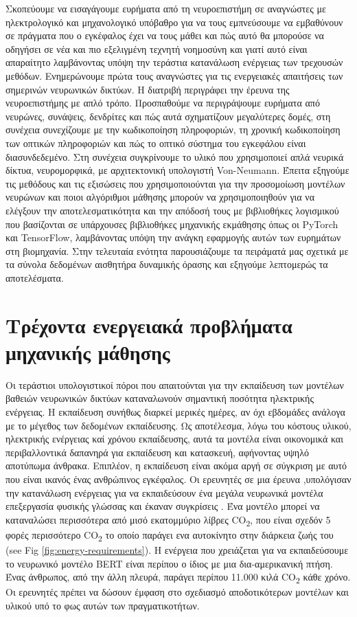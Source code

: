 \documentclass[12pt]{report}
\begin{document}
Σκοπεύουμε να εισαγάγουμε ευρήματα από τη νευροεπιστήμη σε αναγνώστες με ηλεκτρολογικό και μηχανολογικό υπόβαθρο για να τους εμπνεύσουμε να εμβαθύνουν σε πράγματα που ο εγκέφαλος έχει να τους μάθει και πώς αυτό θα μπορούσε να οδηγήσει σε νέα και πιο εξελιγμένη τεχνητή νοημοσύνη και γιατί αυτό είναι απαραίτητο λαμβάνοντας υπόψη την τεράστια κατανάλωση ενέργειας των τρεχουσών μεθόδων. Ενημερώνουμε πρώτα τους αναγνώστες για τις ενεργειακές απαιτήσεις των σημερινών νευρωνικών δικτύων. Η διατριβή περιγράφει την έρευνα της νευροεπιστήμης με απλό τρόπο. Προσπαθούμε να περιγράψουμε ευρήματα από νευρώνες, συνάψεις, δενδρίτες και πώς αυτά σχηματίζουν μεγαλύτερες δομές, στη συνέχεια συνεχίζουμε με την κωδικοποίηση πληροφοριών, τη χρονική κωδικοποίηση των οπτικών πληροφοριών και πώς το οπτικό σύστημα του εγκεφάλου είναι διασυνδεδεμένο. Στη συνέχεια συγκρίνουμε το υλικό που χρησιμοποιεί απλά νευρικά δίκτυα, νευρομορφικά, με αρχιτεκτονική υπολογιστή  \textlatin{Von-Neumann}. Έπειτα εξηγούμε τις μεθόδους και τις εξισώσεις που χρησιμοποιούνται για την προσομοίωση μοντέλων νευρώνων και ποιοι αλγόριθμοι μάθησης μπορούν να χρησιμοποιηθούν για να ελέγξουν την αποτελεσματικότητα και την απόδοσή τους με βιβλιοθήκες λογισμικού που βασίζονται σε υπάρχουσες βιβλιοθήκες μηχανικής εκμάθησης όπως οι \textlatin{PyTorch} και \textlatin{TensorFlow}, λαμβάνοντας υπόψη την ανάγκη εφαρμογής αυτών των ευρημάτων στη βιομηχανία. Στην τελευταία ενότητα παρουσιάζουμε τα πειράματά μας σχετικά με τα σύνολα δεδομένων αισθητήρα δυναμικής όρασης και εξηγούμε λεπτομερώς τα αποτελέσματα.

\section{Τρέχοντα ενεργειακά προβλήματα μηχανικής μάθησης}
Οι τεράστιοι υπολογιστικοί πόροι που απαιτούνται για την εκπαίδευση των μοντέλων βαθειών νευρωνικών δικτύων καταναλωνούν σημαντική ποσότητα ηλεκτρικής ενέργειας. Η εκπαίδευση συνήθως διαρκεί μερικές ημέρες, αν όχι εβδομάδες ανάλογα με το μέγεθος των δεδομένων εκπαίδευσης. Ως αποτέλεσμα, λόγω του κόστους υλικού, ηλεκτρικής ενέργειας καί χρόνου εκπαίδευσης, αυτά τα μοντέλα είναι οικονομικά και περιβαλλοντικά δαπανηρά για εκπαίδευση και κατασκευή, αφήνοντας υψηλό αποτύπωμα άνθρακα. Επιπλέον, η εκπαίδευση είναι ακόμα αργή σε σύγκριση με αυτό που είναι ικανός ένας ανθρώπινος εγκέφαλος. Οι ερευνητές σε μια έρευνα \cite{Strubell2019},υπολόγισαν την κατανάλωση ενέργειας για να εκπαιδεύσουν ένα μεγάλα νευρωνικά μοντέλα επεξεργασία φυσικής γλώσσας και έκαναν συγκρίσεις . Ένα μοντέλο μπορεί να καταναλώσει περισσότερα από μισό εκατομμύριο λίβρες \textlatin{CO}\textsubscript{2}, που είναι σχεδόν 5 φορές περισσότερο \textlatin{CO}\textsubscript{2} το οποίο παράγει ενα αυτοκίνητο στην διάρκεια ζωής του (see Fig \ref{fig:energy-requirements}). Η ενέργεια που χρειάζεται για να εκπαιδεύσουμε το νευρωνικό μοντέλο \textlatin{BERT} είναι περίπου ο ίδιος με μια δια-αμερικανική πτήση. Ένας άνθρωπος, από την άλλη πλευρά, παράγει περίπου 11.000 κιλά \textlatin{CO}\textsubscript{2} κάθε χρόνο. Οι ερευνητές πρέπει να δώσουν έμφαση στο σχεδιασμό αποδοτικότερων μοντέλων και υλικού υπό το φως αυτών των πραγματικοτήτων. 
\end{document}
